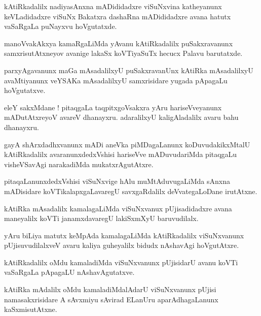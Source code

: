 \documentclass{article}
\begin{document}
\begin{mn}%
kAtiRkadalilx nadiyasAnxna mADididadxre viSuNxvina katheyanunx keVLadidadxre viSuNx Bakatxra 
dashaRna mADididadxre avana hatutx vaSaRgaLa puNayxvu hoVgutatxde.
\end{mn}

\begin{mn}%
manoVvakAkxya kamaRgaLiMda yAvanu kAtiRkadalilx puSakxravanunx samxrisutAtxneyov avanige lakaSx 
koVTiyaSuTx hecucx Palavu barutatxde.
\end{mn}

\begin{mn}%
parxyAgavanunx maGa mAsadalilxyU puSakxravanUnx kAtiRka mAsadalilxyU avaMtiyanunx veYSAKa 
mAsadalilxyU samxrisidare yugada pApagaLu hoVgutatxve.
\end{mn}

\begin{mn}%
eleY sakxMdane ! pitaqgaLa taqpitxgoVsakxra yAru hariseVveyanunx mADutAtxreyoV avareV dhanayxru. 
adaralilxyU kaligAladalilx avaru bahu dhanayxru.
\end{mn}

\begin{mn}%
gayA shArxdadhxvanunx mADi aneVka piMDagaLanunx koDuvudakikxMtalU kAtiRkadalilx 
avaranunxdedxVshisi hariseVve  mADuvudariMda pitaqgaLu visheVSavAgi narakadiMda mukatxrAgutAtxre.
\end{mn}

\begin{mn}%
pitaqaLanunxdedxVshisi viSuNxvige hAlu muMtAduvugaLiMda sAnxna mADisidare koVTikalapxgaLavaregU 
savxgaRdalilx deVvategaLoDane irutAtxne.
\end{mn}

\begin{mn}%
kAtiRka mAsadalilx kamalagaLiMda viSuNxvanux pUjisadidadxre avana maneyalilx koVTi janamxdavaregU 
lakiSxmXyU baruvudilalx.
\end{mn}

\begin{mn}%
yAru biLiya matutx keMpAda kamalagaLiMda kAtiRkadalilx viSuNxvanunx pUjisuvudilalxveV avaru kaliya 
guheyalilx bidudx  nAshavAgi hoVgutAtxre.
\end{mn}

\begin{mn}%
kAtiRkadalilx oMdu kamaladiMda viSuNxvanunx pUjisidarU avanu koVTi vaSaRgaLa pApagaLU 
nAshavAgutatxve.
\end{mn}

\begin{mn}%
kAtiRka mAdalilx oMdu kamaladiMdalAdarU viSuNxvanunx pUjisi namasakxrisidare A sAvxmiyu sAvirad 
ELanUru aparAdhagaLanunx kaSxmisutAtxne.
\end{mn}
\end{document}
